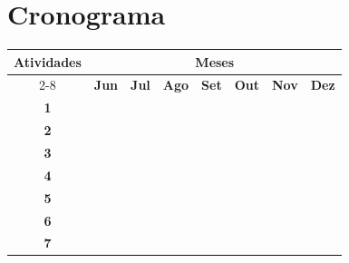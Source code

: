 \section{Cronograma}

\vspace{0.5cm}
\begin{center} %
    \begin{tabular}{|c|c|c|c|c|c|c|c|}
    \hline
    \multirow{2}{*}{\textbf{\small{Atividades}}} &
    \multicolumn{7}{|c|}{\textbf{\small{Meses}}} \\
    \cline{2-8} %
    &\textbf{Jun} & \textbf{Jul} & \textbf{Ago} & \textbf{Set} &
    \textbf{Out} & \textbf{Nov} & \textbf{Dez} \\
    \hline
    \textbf{\small{1}} & \cellcolor{gray} & \cellcolor{gray} & & & & & \\
    \hline
    \textbf{\small{2}} & \cellcolor{gray} & \cellcolor{gray} & & & & & \\
    \hline
    \textbf{\small{3}} & & & \cellcolor{gray} & \cellcolor{gray} & & & \\
    \hline
    \textbf{\small{4}} & & & & & \cellcolor{gray} & & \\
    \hline
    \textbf{\small{5}} & & & & & \cellcolor{gray} & & \\
    \hline
    \textbf{\small{6}} & & & & & & \cellcolor{gray} & \cellcolor{gray} \\
    \hline
    \textbf{\small{7}} & & & & & & \cellcolor{gray} & \cellcolor{gray} \\
    \hline
    \end{tabular}
\end{center}

\vspace{0.5cm}
